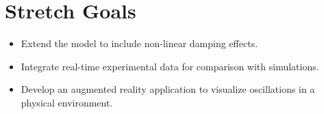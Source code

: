 \documentclass{article}
\begin{document}
\section{Stretch Goals}

\begin{itemize}
    \item Extend the model to include non-linear damping effects.
    \item Integrate real-time experimental data for comparison with simulations.
    \item Develop an augmented reality application to visualize oscillations in a physical environment.
\end{itemize}
\end{document}
